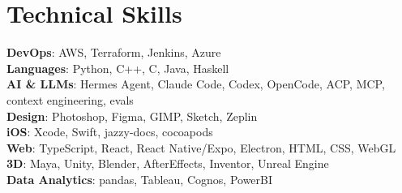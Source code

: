 \documentclass[letterpaper,11pt]{article}
\begin{document}
\section{Technical Skills}
 \begin{itemize}[leftmargin=0.15in, label={}]
    \small{\item{
     \textbf{DevOps}{: AWS, Terraform, Jenkins, Azure} \\
     \textbf{Languages}{: Python, C++, C, Java, Haskell} \\
     \textbf{AI \& LLMs}{: Hermes Agent, Claude Code, Codex, OpenCode, ACP, MCP, context engineering, evals} \\
     \textbf{Design}{: Photoshop, Figma, GIMP, Sketch, Zeplin} \\
     \textbf{iOS}{: Xcode, Swift, jazzy-docs, cocoapods} \\
     \textbf{Web}{: TypeScript, React, React Native/Expo, Electron, HTML, CSS, WebGL} \\
     \textbf{3D}{: Maya, Unity, Blender, AfterEffects, Inventor, Unreal Engine} \\
     \textbf{Data Analytics}{: pandas, Tableau, Cognos, PowerBI}
    }}
 \end{itemize}
\end{document}

